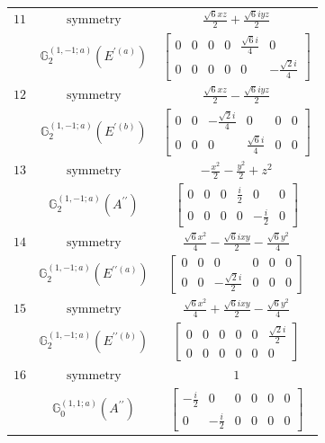 \documentclass[fleqn,8pt,landscape]{jsarticle}
\begin{document}
\begin{longtable}{ccc}
$ 11 $ & $ \text{symmetry} $ & $ \frac{\sqrt{6} x z}{2} + \frac{\sqrt{6} i y z}{2} $ \\
$  $ & $ \mathbb{G}_{2}^{(1,-1;a)}(E^{\prime(a)}) $ & $ \begin{bmatrix} 0 & 0 & 0 & 0 & \frac{\sqrt{6} i}{4} & 0 \\ 0 & 0 & 0 & 0 & 0 & - \frac{\sqrt{2} i}{4} \end{bmatrix} $ \\ \hline
$ 12 $ & $ \text{symmetry} $ & $ \frac{\sqrt{6} x z}{2} - \frac{\sqrt{6} i y z}{2} $ \\
$  $ & $ \mathbb{G}_{2}^{(1,-1;a)}(E^{\prime(b)}) $ & $ \begin{bmatrix} 0 & 0 & - \frac{\sqrt{2} i}{4} & 0 & 0 & 0 \\ 0 & 0 & 0 & \frac{\sqrt{6} i}{4} & 0 & 0 \end{bmatrix} $ \\ \hline
$ 13 $ & $ \text{symmetry} $ & $ - \frac{x^{2}}{2} - \frac{y^{2}}{2} + z^{2} $ \\
$  $ & $ \mathbb{G}_{2}^{(1,-1;a)}(A^{\prime\prime}) $ & $ \begin{bmatrix} 0 & 0 & 0 & \frac{i}{2} & 0 & 0 \\ 0 & 0 & 0 & 0 & - \frac{i}{2} & 0 \end{bmatrix} $ \\ \hline
$ 14 $ & $ \text{symmetry} $ & $ \frac{\sqrt{6} x^{2}}{4} - \frac{\sqrt{6} i x y}{2} - \frac{\sqrt{6} y^{2}}{4} $ \\
$  $ & $ \mathbb{G}_{2}^{(1,-1;a)}(E^{\prime\prime(a)}) $ & $ \begin{bmatrix} 0 & 0 & 0 & 0 & 0 & 0 \\ 0 & 0 & - \frac{\sqrt{2} i}{2} & 0 & 0 & 0 \end{bmatrix} $ \\ \hline
$ 15 $ & $ \text{symmetry} $ & $ \frac{\sqrt{6} x^{2}}{4} + \frac{\sqrt{6} i x y}{2} - \frac{\sqrt{6} y^{2}}{4} $ \\
$  $ & $ \mathbb{G}_{2}^{(1,-1;a)}(E^{\prime\prime(b)}) $ & $ \begin{bmatrix} 0 & 0 & 0 & 0 & 0 & \frac{\sqrt{2} i}{2} \\ 0 & 0 & 0 & 0 & 0 & 0 \end{bmatrix} $ \\ \hline
$ 16 $ & $ \text{symmetry} $ & $ 1 $ \\
$  $ & $ \mathbb{G}_{0}^{(1,1;a)}(A^{\prime\prime}) $ & $ \begin{bmatrix} - \frac{i}{2} & 0 & 0 & 0 & 0 & 0 \\ 0 & - \frac{i}{2} & 0 & 0 & 0 & 0 \end{bmatrix} $ \\ \hline

\end{longtable}
\end{document}

